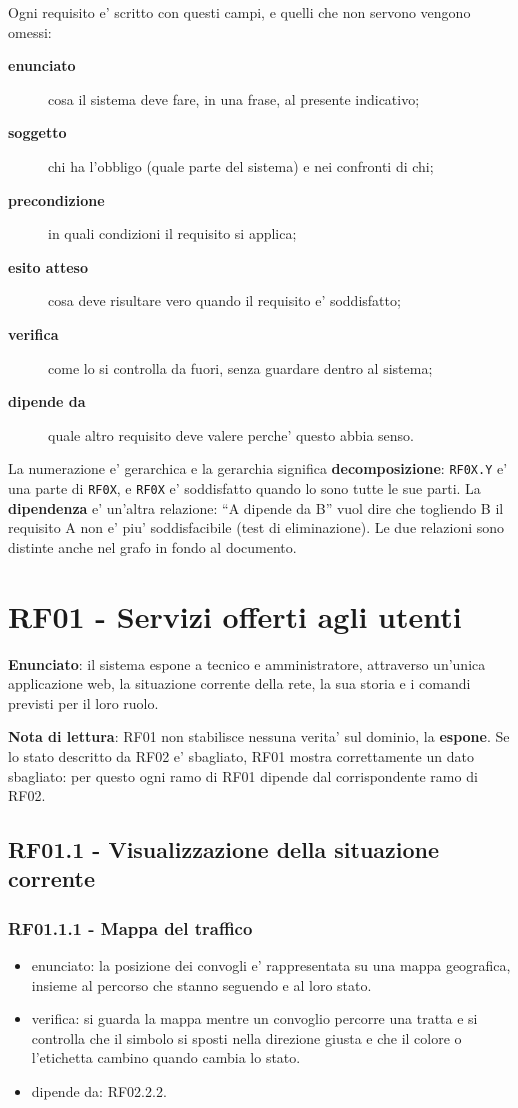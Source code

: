 \documentclass[11pt]{article}
\begin{document}
Ogni requisito e' scritto con questi campi, e quelli che non servono vengono omessi:

\begin{description}
\item[{\textbf{enunciato}}] cosa il sistema deve fare, in una frase, al presente indicativo;
\item[{\textbf{soggetto}}] chi ha l'obbligo (quale parte del sistema) e nei confronti di chi;
\item[{\textbf{precondizione}}] in quali condizioni il requisito si applica;
\item[{\textbf{esito atteso}}] cosa deve risultare vero quando il requisito e' soddisfatto;
\item[{\textbf{verifica}}] come lo si controlla da fuori, senza guardare dentro al sistema;
\item[{\textbf{dipende da}}] quale altro requisito deve valere perche' questo abbia senso.
\end{description}

La numerazione e' gerarchica e la gerarchia significa \textbf{decomposizione}: \texttt{RF0X.Y} e' una parte di
\texttt{RF0X}, e \texttt{RF0X} e' soddisfatto quando lo sono tutte le sue parti. La \textbf{dipendenza} e' un'altra
relazione: ``A dipende da B'' vuol dire che togliendo B il requisito A non e' piu' soddisfacibile
(test di eliminazione). Le due relazioni sono distinte anche nel grafo in fondo al documento.
\section{RF01 - Servizi offerti agli utenti}
\label{sec:orgc713c3c}

\textbf{Enunciato}: il sistema espone a tecnico e amministratore, attraverso un'unica applicazione web, la
situazione corrente della rete, la sua storia e i comandi previsti per il loro ruolo.

\textbf{Nota di lettura}: RF01 non stabilisce nessuna verita' sul dominio, la \textbf{espone}. Se lo stato
descritto da RF02 e' sbagliato, RF01 mostra correttamente un dato sbagliato: per questo ogni ramo di
RF01 dipende dal corrispondente ramo di RF02.
\subsection{RF01.1 - Visualizzazione della situazione corrente}
\label{sec:org5a72731}
\subsubsection{RF01.1.1 - Mappa del traffico}
\label{sec:orgf2c725d}
\begin{itemize}
\item enunciato: la posizione dei convogli e' rappresentata su una mappa geografica, insieme al percorso
che stanno seguendo e al loro stato.
\item verifica: si guarda la mappa mentre un convoglio percorre una tratta e si controlla che il simbolo
si sposti nella direzione giusta e che il colore o l'etichetta cambino quando cambia lo stato.
\item dipende da: RF02.2.2.
\end{itemize}
\end{document}

